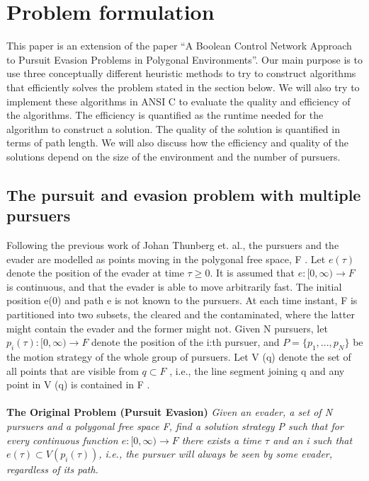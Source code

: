 \chapter{Problem formulation}

This paper is an extension of the paper ``A Boolean Control Network Approach to Pursuit Evasion Problems in Polygonal Environments''\cite{paper1}. Our main purpose is to use three conceptually different heuristic methods to try to construct algorithms that efficiently solves the problem stated in the section below. We will also try to implement these algorithms in ANSI C to evaluate the quality and efficiency of the algorithms. The efficiency is quantified as the runtime needed for the algorithm to construct a solution. The quality of the solution is quantified in terms of path length. We will also discuss how the efficiency and quality of the solutions depend on the size of the environment and the number of pursuers.
\section {The pursuit and evasion problem with multiple pursuers}
Following the previous work of Johan Thunberg  et. al.\cite{paper1}, the pursuers and the evader are modelled as points moving in the polygonal free space, F . Let  $e(\tau )$ denote the position of the evader at time $\tau \geq 0$. It is assumed that $e : \lbrack 0, \infty) \to F$ is continuous, and that the evader is able to move arbitrarily fast. The initial position e(0) and path e is not known to the pursuers. At each time instant, F is partitioned into two subsets, the cleared and the contaminated, where the latter might contain the evader and the former might not. Given N pursuers, let $p_i (\tau ) : \lbrack 0, \infty) \to F$ denote the position of the i:th pursuer, and $P = \lbrace p_1 , . . . , p_N \rbrace$ be the motion strategy of the whole group of pursuers. Let V (q) denote the set of all points that are visible from $q \subset F$ , i.e., the line segment joining q and any point in V (q) is contained in F .\\
\\
\textbf{The Original Problem (Pursuit Evasion)} \emph{ Given an evader, a set of N pursuers and a polygonal free space F, find a solution strategy P such that for every continuous function $e : \lbrack 0, \infty) \to F$ there exists a time $\tau$ and an i such that $e(\tau ) \subset V (p_i (\tau ))$, i.e., the pursuer will always be seen by some evader, regardless of its path. }

